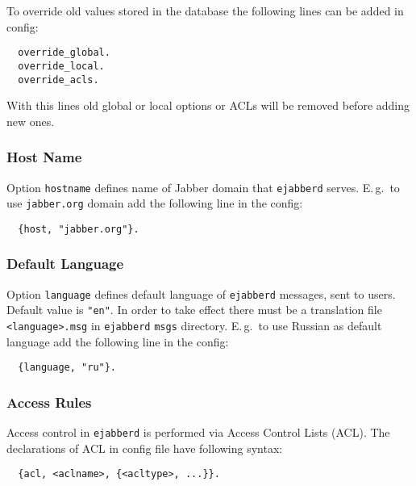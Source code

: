 \documentclass[a4paper,10pt]{article}
\newcommand{\jid}[1]{\texttt{#1}}
\newcommand{\option}[1]{\texttt{#1}}
\newcommand{\term}[1]{\texttt{#1}}
\newcommand{\ejabberd}{\texttt{ejabberd}}
\newcommand{\Jabber}{Jabber}
\begin{document}
To override old values stored in the database the following lines can be added
in config:
\begin{verbatim}
  override_global.
  override_local.
  override_acls.
\end{verbatim}
With this lines old global or local options or ACLs will be removed before
adding new ones.


\subsubsection{Host Name}
\label{sec:confighostname}

Option \option{hostname} defines name of \Jabber{} domain that \ejabberd{}
serves.  E.\,g.\ to use \jid{jabber.org} domain add the following line in the config:
\begin{verbatim}
  {host, "jabber.org"}.
\end{verbatim}


\subsubsection{Default Language}
\label{sec:configlanguage}

Option \option{language} defines default language of \ejabberd{} messages, sent
to users. Default value is \term{"en"}. In order to take effect there must be a
translation file \term{<language>.msg} in \ejabberd{} \term{msgs} directory.
E.\,g.\ to use Russian as default language add the following line in the config:
\begin{verbatim}
  {language, "ru"}.
\end{verbatim}


\subsubsection{Access Rules}
\label{sec:configaccess}

Access control in \ejabberd{} is performed via Access Control Lists (ACL).  The
declarations of ACL in config file have following syntax:
\begin{verbatim}
  {acl, <aclname>, {<acltype>, ...}}.
\end{verbatim}
\end{document}
